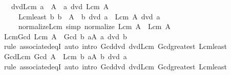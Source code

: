 \begin{isabellebody}
\ \ \ dvd{\isacharunderscore}{\kern0pt}Lcm{\isacharcolon}{\kern0pt}\ {\isachardoublequoteopen}a\ {\isasymin}\ A\ {\isasymLongrightarrow}\ a\ dvd\ Lcm\ A{\isachardoublequoteclose}\isanewline
\ \ \ \ \ Lcm{\isacharunderscore}{\kern0pt}least{\isacharcolon}{\kern0pt}\ {\isachardoublequoteopen}{\isacharparenleft}{\kern0pt}{\isasymAnd}b{\isachardot}{\kern0pt}\ b\ {\isasymin}\ A\ {\isasymLongrightarrow}\ b\ dvd\ a{\isacharparenright}{\kern0pt}\ {\isasymLongrightarrow}\ Lcm\ A\ dvd\ a{\isachardoublequoteclose}\isanewline
\ \ \ \ \ normalize{\isacharunderscore}{\kern0pt}Lcm\ {\isacharbrackleft}{\kern0pt}simp{\isacharbrackright}{\kern0pt}{\isacharcolon}{\kern0pt}\ {\isachardoublequoteopen}normalize\ {\isacharparenleft}{\kern0pt}Lcm\ A{\isacharparenright}{\kern0pt}\ {\isacharequal}{\kern0pt}\ Lcm\ A{\isachardoublequoteclose}\isanewline
{}\isanewline
\isanewline
{}\isamarkupfalse%
\ Lcm{\isacharunderscore}{\kern0pt}Gcd{\isacharcolon}{\kern0pt}\ {\isachardoublequoteopen}Lcm\ A\ {\isacharequal}{\kern0pt}\ Gcd\ {\isacharbraceleft}{\kern0pt}b{\isachardot}{\kern0pt}\ {\isasymforall}a{\isasymin}A{\isachardot}{\kern0pt}\ a\ dvd\ b{\isacharbraceright}{\kern0pt}{\isachardoublequoteclose}\isanewline
%
\isadelimproof
\ \ %
\endisadelimproof
%
\isatagproof
{}\isamarkupfalse%
\ {\isacharparenleft}{\kern0pt}rule\ associated{\isacharunderscore}{\kern0pt}eqI{\isacharparenright}{\kern0pt}\ {\isacharparenleft}{\kern0pt}auto\ intro{\isacharcolon}{\kern0pt}\ Gcd{\isacharunderscore}{\kern0pt}dvd\ dvd{\isacharunderscore}{\kern0pt}Lcm\ Gcd{\isacharunderscore}{\kern0pt}greatest\ Lcm{\isacharunderscore}{\kern0pt}least{\isacharparenright}{\kern0pt}%
\endisatagproof
{\isafoldproof}%
%
\isadelimproof
\isanewline
%
\endisadelimproof
\isanewline
{}\isamarkupfalse%
\ Gcd{\isacharunderscore}{\kern0pt}Lcm{\isacharcolon}{\kern0pt}\ {\isachardoublequoteopen}Gcd\ A\ {\isacharequal}{\kern0pt}\ Lcm\ {\isacharbraceleft}{\kern0pt}b{\isachardot}{\kern0pt}\ {\isasymforall}a{\isasymin}A{\isachardot}{\kern0pt}\ b\ dvd\ a{\isacharbraceright}{\kern0pt}{\isachardoublequoteclose}\isanewline
%
\isadelimproof
\ \ %
\endisadelimproof
%
\isatagproof
{}\isamarkupfalse%
\ {\isacharparenleft}{\kern0pt}rule\ associated{\isacharunderscore}{\kern0pt}eqI{\isacharparenright}{\kern0pt}\ {\isacharparenleft}{\kern0pt}auto\ intro{\isacharcolon}{\kern0pt}\ Gcd{\isacharunderscore}{\kern0pt}dvd\ dvd{\isacharunderscore}{\kern0pt}Lcm\ Gcd{\isacharunderscore}{\kern0pt}greatest\ Lcm{\isacharunderscore}{\kern0pt}least{\isacharparenright}{\kern0pt}%

\end{isabellebody}
